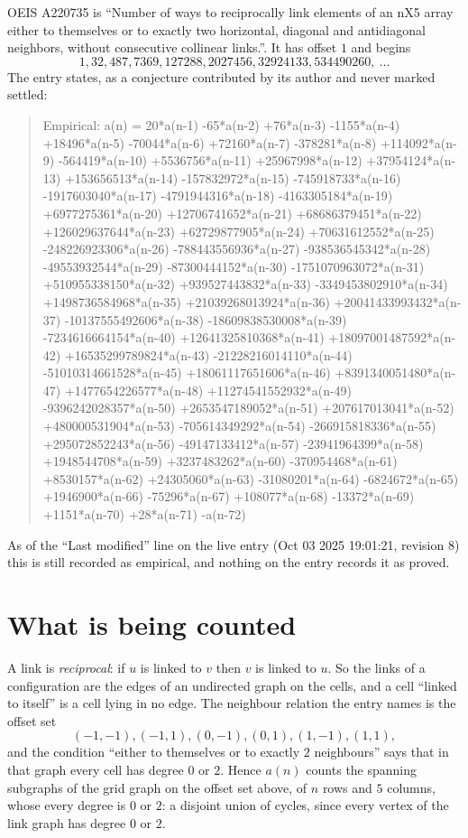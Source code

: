 \documentclass[11pt,a4paper]{article}
\theoremstyle{plain}
\theoremstyle{definition}
\begin{document}
OEIS A220735 is ``Number of ways to reciprocally link elements of an nX5 array either to themselves or to exactly two horizontal, diagonal and antidiagonal neighbors, without consecutive collinear links.''. It has offset $1$ and begins
\[
1, 32, 487, 7369, 127288, 2027456, 32924133, 534490260,\ \dots
\]
The entry states, as a conjecture contributed by its author and never marked settled:
\begin{quote}
Empirical: a(n) = 20*a(n-1) -65*a(n-2) +76*a(n-3) -1155*a(n-4) +18496*a(n-5) -70044*a(n-6) +72160*a(n-7) -378281*a(n-8) +114092*a(n-9) -564419*a(n-10) +5536756*a(n-11) +25967998*a(n-12) +37954124*a(n-13) +153656513*a(n-14) -157832972*a(n-15) -745918733*a(n-16) -1917603040*a(n-17) -4791944316*a(n-18) -4163305184*a(n-19) +6977275361*a(n-20) +12706741652*a(n-21) +68686379451*a(n-22) +126029637644*a(n-23) +62729877905*a(n-24) +70631612552*a(n-25) -248226923306*a(n-26) -788443556936*a(n-27) -938536545342*a(n-28) -49553932544*a(n-29) -87300444152*a(n-30) -1751070963072*a(n-31) +510955338150*a(n-32) +939527443832*a(n-33) -3349453802910*a(n-34) +1498736584968*a(n-35) +21039268013924*a(n-36) +20041433993432*a(n-37) -10137555492606*a(n-38) -18609838530008*a(n-39) -7234616664154*a(n-40) +12641325810368*a(n-41) +18097001487592*a(n-42) +16535299789824*a(n-43) -21228216014110*a(n-44) -51010314661528*a(n-45) +18061117651606*a(n-46) +8391340051480*a(n-47) +1477654226577*a(n-48) +11274541552932*a(n-49) -9396242028357*a(n-50) +2653547189052*a(n-51) +207617013041*a(n-52) +480000531904*a(n-53) -705614349292*a(n-54) -266915818336*a(n-55) +295072852243*a(n-56) -49147133412*a(n-57) -23941964399*a(n-58) +1948544708*a(n-59) +3237483262*a(n-60) -370954468*a(n-61) +8530157*a(n-62) +24305060*a(n-63) -31080201*a(n-64) -6824672*a(n-65) +1946900*a(n-66) -75296*a(n-67) +108077*a(n-68) -13372*a(n-69) +1151*a(n-70) +28*a(n-71) -a(n-72)
\end{quote}
As of the ``Last modified'' line on the live entry (Oct 03 2025 19:01:21, revision 8) this is still
recorded as empirical, and nothing on the entry records it as proved.

\section{What is being counted}

A link is \emph{reciprocal}: if $u$ is linked to $v$ then $v$ is linked to $u$. So the links
of a configuration are the edges of an undirected graph on the cells, and a cell ``linked to
itself'' is a cell lying in no edge. The neighbour relation the entry names is the offset set
\[
(-1,-1), (-1,1), (0,-1), (0,1), (1,-1), (1,1),
\]
and the condition ``either to themselves or to exactly $2$ neighbours'' says that in that
graph every cell has degree $0$ or $2$. Hence $a(n)$ counts the spanning subgraphs of the
grid graph on the offset set above, of $n$ rows and $5$ columns,
whose every degree is $0$ or $2$: a disjoint union of cycles, since every vertex of the link graph has degree $0$ or $2$.
\end{document}
